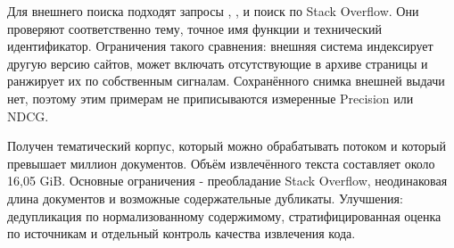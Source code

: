Для внешнего поиска подходят запросы
,
,
 и поиск
 по Stack Overflow.
Они проверяют соответственно тему, точное имя функции и технический
идентификатор. Ограничения такого сравнения: внешняя система индексирует
другую версию сайтов, может включать отсутствующие в архиве страницы и
ранжирует их по собственным сигналам. Сохранённого снимка внешней выдачи
нет, поэтому этим примерам не приписываются измеренные Precision или NDCG.

\conclusions
Получен тематический корпус, который можно обрабатывать потоком и который
превышает миллион документов. Объём извлечённого текста составляет около
16,05 GiB. Основные ограничения - преобладание Stack Overflow,
неодинаковая длина документов и возможные содержательные дубликаты.
Улучшения: дедупликация по нормализованному содержимому, стратифицированная
оценка по источникам и отдельный контроль качества извлечения кода.
